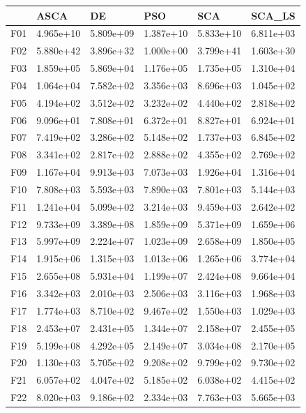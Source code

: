 \begin{tabular}{llllll}
\toprule
{} &       ASCA &         DE &        PSO &        SCA &     SCA\_LS \\
\midrule
F01  &  4.965e+10 &  5.809e+09 &  1.387e+10 &  5.833e+10 &  6.811e+03 \\
F02  &  5.880e+42 &  3.896e+32 &  1.000e+00 &  3.799e+41 &  1.603e+30 \\
F03  &  1.859e+05 &  5.869e+04 &  1.176e+05 &  1.735e+05 &  1.310e+04 \\
F04  &  1.064e+04 &  7.582e+02 &  3.356e+03 &  8.696e+03 &  1.045e+02 \\
F05  &  4.194e+02 &  3.512e+02 &  3.232e+02 &  4.440e+02 &  2.818e+02 \\
F06  &  9.096e+01 &  7.808e+01 &  6.372e+01 &  8.827e+01 &  6.924e+01 \\
F07  &  7.419e+02 &  3.286e+02 &  5.148e+02 &  1.737e+03 &  6.845e+02 \\
F08  &  3.341e+02 &  2.817e+02 &  2.888e+02 &  4.355e+02 &  2.769e+02 \\
F09  &  1.167e+04 &  9.913e+03 &  7.073e+03 &  1.926e+04 &  1.316e+04 \\
F10  &  7.808e+03 &  5.593e+03 &  7.890e+03 &  7.801e+03 &  5.144e+03 \\
F11  &  1.241e+04 &  5.099e+02 &  3.214e+03 &  9.459e+03 &  2.642e+02 \\
F12  &  9.733e+09 &  3.389e+08 &  1.859e+09 &  5.371e+09 &  1.659e+06 \\
F13  &  5.997e+09 &  2.224e+07 &  1.023e+09 &  2.658e+09 &  1.850e+05 \\
F14  &  1.915e+06 &  1.315e+03 &  1.013e+06 &  1.265e+06 &  3.774e+04 \\
F15  &  2.655e+08 &  5.931e+04 &  1.199e+07 &  2.424e+08 &  9.664e+04 \\
F16  &  3.342e+03 &  2.010e+03 &  2.506e+03 &  3.116e+03 &  1.968e+03 \\
F17  &  1.774e+03 &  8.710e+02 &  9.467e+02 &  1.550e+03 &  1.029e+03 \\
F18  &  2.453e+07 &  2.431e+05 &  1.344e+07 &  2.158e+07 &  2.455e+05 \\
F19  &  5.199e+08 &  4.292e+05 &  2.149e+07 &  3.034e+08 &  2.170e+05 \\
F20  &  1.130e+03 &  5.705e+02 &  9.208e+02 &  9.799e+02 &  9.730e+02 \\
F21  &  6.057e+02 &  4.047e+02 &  5.185e+02 &  6.038e+02 &  4.415e+02 \\
F22  &  8.020e+03 &  9.186e+02 &  2.334e+03 &  7.763e+03 &  5.665e+03 \\

\end{tabular}
